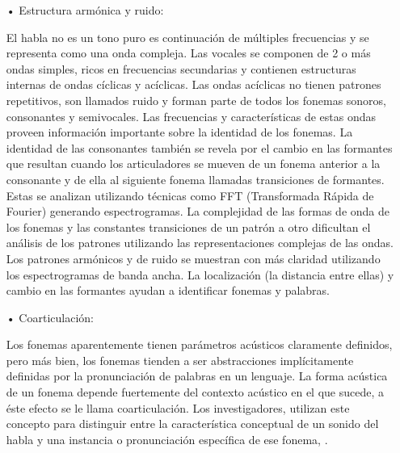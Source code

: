\begin{enumerate}
\begin{enumerate}
\item[•]Estructura armónica y ruido:
\par
El habla no es un tono puro es continuación de múltiples frecuencias y se representa como una onda compleja. Las vocales se componen de 2 o más ondas simples, ricos en frecuencias secundarias y contienen estructuras internas de ondas cíclicas y acíclicas.
\vskip 0.5cm
Las ondas acíclicas no tienen patrones repetitivos, son llamados ruido y forman parte de todos los fonemas sonoros, consonantes y semivocales. Las frecuencias y características de estas ondas proveen información importante sobre la identidad de los fonemas.
\vskip 0.5cm
La identidad de las consonantes también se revela por el cambio en las formantes que resultan cuando los articuladores se mueven de un fonema anterior a la consonante y de ella al siguiente fonema llamadas transiciones de formantes. Estas se analizan utilizando técnicas como FFT (Transformada Rápida de Fourier) generando espectrogramas.
\vskip 0.5cm
La complejidad de las formas de onda de los fonemas y las constantes transiciones de un patrón a otro dificultan el análisis de los patrones utilizando las representaciones complejas de las ondas. Los patrones armónicos y de ruido se muestran con más claridad utilizando los espectrogramas de banda ancha. La localización (la distancia entre ellas) y cambio en las formantes ayudan a identificar fonemas y palabras.

\item[•]Coarticulación:
\par
Los fonemas aparentemente tienen parámetros acústicos claramente definidos, pero más bien, los fonemas tienden a ser abstracciones implícitamente definidas por la pronunciación de palabras en un lenguaje. La forma acústica de un fonema depende fuertemente del contexto acústico en el que sucede, a éste efecto se le llama coarticulación. Los investigadores, utilizan este concepto para distinguir entre la característica conceptual de un sonido del habla y una instancia o pronunciación específica de ese fonema, \cite{franco}.
\end{enumerate}


\end{enumerate}
